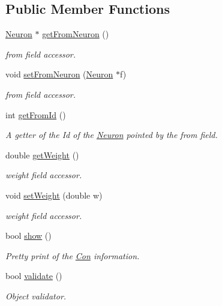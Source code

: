 \subsection*{Public Member Functions}
\begin{DoxyCompactItemize}
\item 
\hyperlink{class_neuron}{Neuron} $\ast$ \hyperlink{class_con_a970a74ffcba9433d6f383ecab398f25f}{getFromNeuron} ()
\begin{DoxyCompactList}\small\item\em from field accessor. \end{DoxyCompactList}\item 
void \hyperlink{class_con_a19ca0a1d257a3f002693a441db03aeb4}{setFromNeuron} (\hyperlink{class_neuron}{Neuron} $\ast$f)
\begin{DoxyCompactList}\small\item\em from field accessor. \end{DoxyCompactList}\item 
int \hyperlink{class_con_aad72314592bebdcae6c68a67d2b4a505}{getFromId} ()
\begin{DoxyCompactList}\small\item\em A getter of the Id of the \hyperlink{class_neuron}{Neuron} pointed by the from field. \end{DoxyCompactList}\item 
double \hyperlink{class_con_a385c5bf6eb9e2ffc94c5b427c287ccb2}{getWeight} ()
\begin{DoxyCompactList}\small\item\em weight field accessor. \end{DoxyCompactList}\item 
void \hyperlink{class_con_aa9b30bb7eda5c5578d11a65977968d38}{setWeight} (double w)
\begin{DoxyCompactList}\small\item\em weight field accessor. \end{DoxyCompactList}\item 
bool \hyperlink{class_con_ab85838575b5e01f3b8073136f2102922}{show} ()
\begin{DoxyCompactList}\small\item\em Pretty print of the \hyperlink{class_con}{Con} information. \end{DoxyCompactList}\item 
bool \hyperlink{class_con_af5f836a7b0988b3d9113589b2959d5e6}{validate} ()
\begin{DoxyCompactList}\small\item\em Object validator. \end{DoxyCompactList}\end{DoxyCompactItemize}
